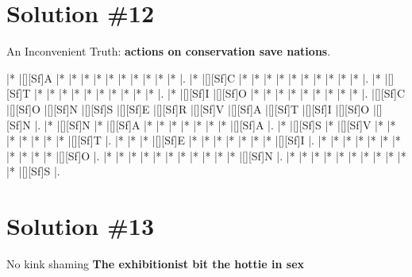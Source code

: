 \documentclass[letterpaper]{article}
\begin{document}
\newpage
\section*{Solution \#12}

An Inconvenient Truth:
\newline\textbf{actions on conservation save nations}.

\vspace*{1em}
\begin{Puzzle}{12}{11}
|*        |[][Sf]A  |*        |*        |*        |*        |*        |*        |*        |*        |*        |*        |. 
|*        |[][Sf]C  |*        |*        |*        |*        |*        |*        |*        |*        |*        |*        |.  
|*        |[][Sf]T  |*        |*        |*        |*        |*        |*        |*        |*        |*        |*        |.
|*        |[][Sf]I  |[][Sf]O  |*        |*        |*        |*        |*        |*        |*        |*        |*        |.  
|[][Sf]C  |[][Sf]O  |[][Sf]N  |[][Sf]S  |[][Sf]E  |[][Sf]R  |[][Sf]V  |[][Sf]A  |[][Sf]T  |[][Sf]I  |[][Sf]O  |[][Sf]N  |.
|*        |[][Sf]N  |*        |[][Sf]A  |*        |*        |*        |*        |*        |*        |*        |[][Sf]A  |. 
|*        |[][Sf]S  |*        |[][Sf]V  |*        |*        |*        |*        |*        |*        |*        |[][Sf]T  |.
|*        |*        |*        |[][Sf]E  |*        |*        |*        |*        |*        |*        |*        |[][Sf]I  |.
|*        |*        |*        |*        |*        |*        |*        |*        |*        |*        |*        |[][Sf]O  |.
|*        |*        |*        |*        |*        |*        |*        |*        |*        |*        |*        |[][Sf]N  |.
|*        |*        |*        |*        |*        |*        |*        |*        |*        |*        |*        |[][Sf]S  |.
\end{Puzzle}

\newpage
\section*{Solution \#13}
No kink shaming
\newline\textbf{The exhibitionist bit the hottie in sex}
\end{document}
